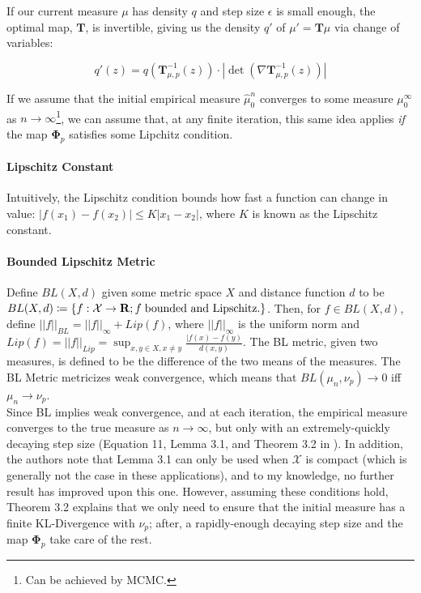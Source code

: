 \documentclass[12pt]{article}
\begin{document}
\noindent If our current measure $\mu$ has density $q$ and step size $\epsilon$ is small enough, the optimal map, $\mathbf{T}$, is invertible, giving us the density $q'$ of $\mu' = \mathbf{T}\mu$ via change of variables:

\begin{equation}
    q'(z) = q(\mathbf{T}^{-1}_{\mu, p}(z)) \cdot |\det (\nabla \mathbf{T}^{-1}_{\mu, p}(z))|
    \label{eq:densityevolution}
\end{equation}

\noindent If we assume that the initial empirical measure $\hat\mu^n_0$ converges to some measure $\mu_0^\infty$ as $n \rightarrow \infty$\footnote{Can be achieved by MCMC.}, we can assume that, at any finite iteration, this same idea applies \textit{if} the map $\mathbf{\Phi}_p$ satisfies some Lipchitz condition.

\paragraph{Lipschitz Constant} Intuitively, the Lipschitz condition bounds how fast a function can change in value: $| f(x_1) - f(x_2) | \leq K|x_1 - x_2|$, where $K$ is known as the Lipschitz constant. 

\paragraph{Bounded Lipschitz Metric} Define $BL(X, d)$ given some metric space $X$ and distance function $d$ to be $BL(X, d) \coloneqq \{ f: \mathcal{X} \rightarrow \mathbf{R}; f \; \textup{bounded and Lipschitz}. \}$. Then, for $f \in BL(X, d)$, define $||f||_{BL} = ||f||_\infty + Lip(f)$, where $||f||_\infty$ is the uniform norm and $Lip(f) = ||f||_{Lip} = \sup_{x, y \in X, x \neq y} \frac{|f(x) - f(y)}{d(x, y)}$. The BL metric, given two measures, is defined to be the difference of the two means of the measures. The BL Metric metricizes weak convergence, which means that $BL(\mu_n, \nu_p) \rightarrow 0$ iff $\mu_n \rightarrow \nu_p$. \\

\noindent Since BL implies weak convergence, and at each iteration, the empirical measure converges to the true measure as $n \rightarrow \infty$, but only with an extremely-quickly decaying step size (Equation 11, Lemma 3.1, and Theorem 3.2 in \cite{liu2017gradflow}). In addition, the authors note that Lemma 3.1 can only be used when $\mathcal{X}$ is compact (which is generally not the case in these applications), and to my knowledge, no further result has improved upon this one. However, assuming these conditions hold, Theorem 3.2 explains that we only need to ensure that the initial measure has a finite KL-Divergence with $\nu_p$; after, a rapidly-enough decaying step size and the map $\mathbf{\Phi}_p$ take care of the rest.
\end{document}
